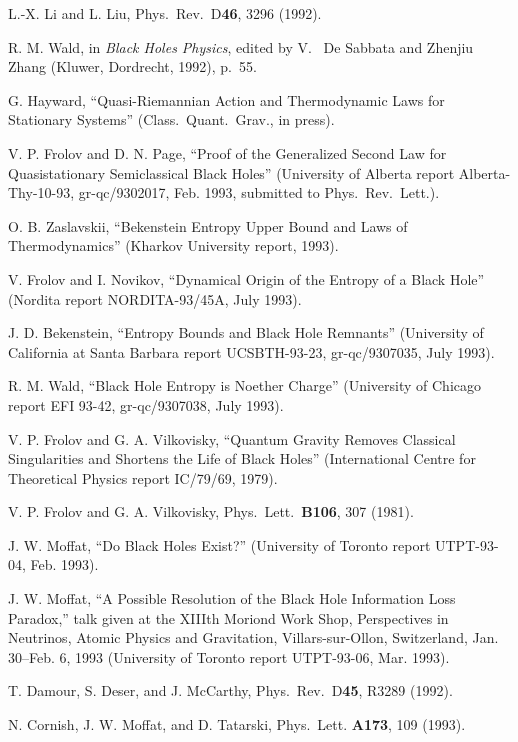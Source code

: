 \documentclass[12pt]{article}
\begin{document}
\begin{thebibliography}{999}
 L.-X. Li and L. Liu, Phys.\ Rev.\ D{\bf 46}, 3296
(1992).

 R. M. Wald, in {\em Black Holes Physics}, edited by
V.~
 De Sabbata and Zhenjiu Zhang (Kluwer, Dordrecht, 1992), p.~55.

  G. Hayward, ``Quasi-Riemannian Action and
 Thermodynamic Laws for Stationary Systems''
 (Class.\ Quant.\ Grav., in press).

 V. P. Frolov and D. N. Page, ``Proof of the
Generalized
Second Law for Quasistationary Semiclassical Black Holes''
(University
of Alberta report Alberta-Thy-10-93, gr-qc/9302017, Feb. 1993,
submitted to Phys.\ Rev.\ Lett.).

 O. B. Zaslavskii, ``Bekenstein Entropy Upper
Bound and Laws of Thermodynamics'' (Kharkov University report, 1993).

 V. Frolov and I. Novikov,
``Dynamical Origin of the Entropy of a Black Hole''
(Nordita report NORDITA-93/45A, July 1993).

 J. D. Bekenstein, ``Entropy Bounds and Black Hole
Remnants''
(University of California at Santa Barbara report UCSBTH-93-23,
gr-qc/9307035,
July 1993).

 R. M. Wald, ``Black Hole Entropy is Noether Charge''
(University of Chicago report EFI 93-42, gr-qc/9307038, July 1993).

 V. P. Frolov and G. A. Vilkovisky, ``Quantum Gravity
Removes Classical Singularities and Shortens the Life of Black
Holes''
(International Centre for Theoretical Physics report IC/79/69, 1979).

 V. P. Frolov and G. A. Vilkovisky, Phys.\ Lett.\
{\bf B106}, 307 (1981).

 J. W. Moffat, ``Do Black Holes Exist?'' (University
of Toronto
report UTPT-93-04, Feb. 1993).

 J. W. Moffat, ``A Possible Resolution of the Black
Hole
Information Loss Paradox,'' talk given at the XIIIth Moriond Work
Shop,
Perspectives in Neutrinos, Atomic Physics and Gravitation,
Villars-sur-Ollon,
Switzerland, Jan. 30--Feb. 6, 1993 (University of Toronto
report UTPT-93-06, Mar. 1993).

 T. Damour, S. Deser, and J. McCarthy,
Phys.\ Rev.\ D{\bf 45}, R3289 (1992).

 N. Cornish, J. W. Moffat, and D. Tatarski,
Phys.\ Lett. {\bf A173}, 109 (1993).


\end{thebibliography}
\end{document}
